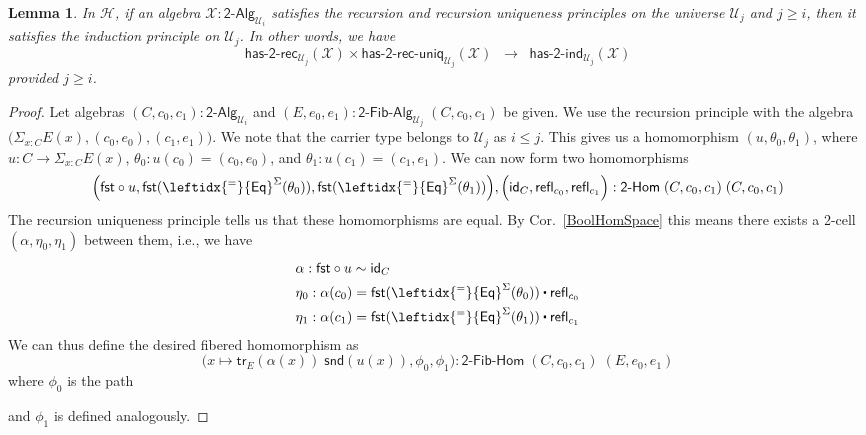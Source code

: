 \documentclass[reqno,10pt,a4paper,oneside]{amsart}
\newcommand{\X}{\mathcal{X}}
\newcommand{\fst}{\mathsf{fst}}
\newcommand{\snd}{\mathsf{snd}}
\newcommand{\comp}{\circ}
\newcommand{\idfun}[1]{\mathsf{id}_{#1}}
\newcommand{\sm}[1]{\Sigma_{#1}}
\newcommand{\refl}{\mathsf{refl}}
\newcommand{\idtodpair}{\leftidx{^=}{\mathsf{Eq}}^{\Sigma}}
\newcommand{\UU}{\mathcal{U}}
\newcommand{\BoolAlg}{\mathsf{2}\text{-}\mathsf{Alg}}
\newcommand{\BoolHom}{\mathsf{2}\text{-}\mathsf{Hom}}
\newcommand{\HasBoolRec}{\mathsf{has}\text{-}\mathsf{2}\text{-}\mathsf{rec}}
\newcommand{\HasBoolInd}{\mathsf{has}\text{-}\mathsf{2}\text{-}\mathsf{ind}}
\newcommand{\HasBoolRecUniq}{\mathsf{has}\text{-}\mathsf{2}\text{-}\mathsf{rec}\text{-}\mathsf{uniq}}
\newcommand{\BoolFibAlg}{\mathsf{2}\text{-}\mathsf{Fib}\text{-}\mathsf{Alg}}
\newcommand{\BoolFibHom}{\mathsf{2}\text{-}\mathsf{Fib}\text{-}\mathsf{Hom}}
\newcommand{\trans}{\mathsf{tr}}
\newcommand{\Hint}{\mathcal{H}}
\newcommand{\ct}{%
  \mathchoice{\mathbin{\raisebox{0.5ex}{$\displaystyle\centerdot$}}}%
             {\mathbin{\raisebox{0.5ex}{$\centerdot$}}}%
             {\mathbin{\raisebox{0.25ex}{$\scriptstyle\,\centerdot\,$}}}%
             {\mathbin{\raisebox{0.1ex}{$\scriptscriptstyle\,\centerdot\,$}}}}
\numberwithin{equation}{section}
\theoremstyle{mythm}
\newtheorem{lemma}[theorem]{Lemma}
\theoremstyle{mydef}
\theoremstyle{myrmk}
\begin{document}
\begin{lemma}\label{lem:BoolRecUniqImpIndInt}
In $\Hint$, if an algebra $\X : \BoolAlg_{\UU_i}$ satisfies the recursion and recursion uniqueness principles on the universe $\UU_j$ and $j \geq i$, then it satisfies the induction principle on $\UU_j$. In other words, we have
\[ \HasBoolRec_{\UU_j}(\X) \times \HasBoolRecUniq_{\UU_j}(\X) \;\; \rightarrow \; \; \HasBoolInd_{\UU_j}(\X) \]
provided $j \geq i$.
\end{lemma}
\begin{proof}
Let algebras $(C,c_0,c_1) : \BoolAlg_{\UU_i}$ and $(E,e_0,e_1) : \BoolFibAlg_{\UU_j} \; (C,c_0,c_1)$ be given. 
We use the recursion principle with the algebra $\big(\sm{x:C} E(x), (c_0,e_0), (c_1,e_1)\big)$. We note that the carrier type belongs to $\UU_j$ as $i \leq j$. This gives us a homomorphism $(u,\theta_0,\theta_1)$, where $u : C \to \sm{x:C} E(x)$, $\theta_0 : u(c_0) = (c_0,e_0)$, and $\theta_1 : u(c_1) = (c_1,e_1)$. We can now form two homomorphisms 
\[\Big(\fst \comp u, \fst(\idtodpair(\theta_0)), \fst(\idtodpair(\theta_1))\Big), \Big(\idfun{C}, \refl_{c_0}, \refl_{c_1}\Big) : \BoolHom \; (C,c_0,c_1) \; (C,c_0,c_1)\]
The recursion uniqueness principle tells us that these homomorphisms are equal. By Cor.~\ref{BoolHomSpace} this means there exists a 2-cell $(\alpha,\eta_0,\eta_1)$ between them, i.e., we have 
\begin{align*}
& \alpha : \fst \comp u \sim \idfun{C} \\
& \eta_0 : \alpha(c_0) = \fst(\idtodpair(\theta_0)) \ct \refl_{c_0} \\
& \eta_1 : \alpha(c_1) = \fst(\idtodpair(\theta_1)) \ct \refl_{c_1}
\end{align*}
We can thus define the desired fibered homomorphism as \[\Big(x \mapsto \trans_E(\alpha(x)) \; \snd(u(x)), \phi_0, \phi_1\Big) : \BoolFibHom \; (C,c_0,c_1) \; (E,e_0,e_1)\]
where $\phi_0$ is the path
\begin{center}
\end{center}
and $\phi_1$ is defined analogously.
\end{proof}
\end{document}
